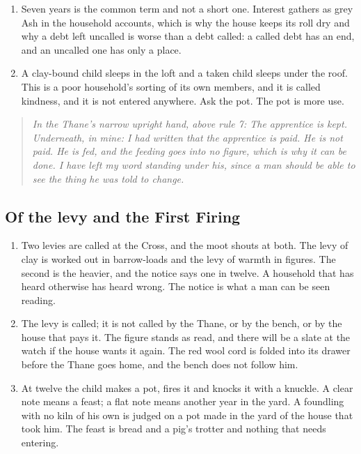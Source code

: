 \documentclass{design/chronicle}
\begin{document}
\begin{enumerate}[leftmargin=1.4em,itemsep=1pt,topsep=3pt,parsep=0pt]

\item Seven years is the common term and not a short one. Interest gathers as grey Ash in the household accounts, which is why the house keeps its roll dry and why a debt left uncalled is worse than a debt called: a called debt has an end, and an uncalled one has only a place.

\item A clay-bound child sleeps in the loft and a taken child sleeps under the roof. This is a poor household’s sorting of its own members, and it is called kindness, and it is not entered anywhere. Ask the pot. The pot is more use.

\end{enumerate}

\begin{quote}\itshape \emph{In the Thane’s narrow upright hand, above rule 7:} The apprentice is kept. \emph{Underneath, in mine:} I had written that the apprentice is paid. He is not paid. He is fed, and the feeding goes into no figure, which is why it can be done. I have left my word standing under his, since a man should be able to see the thing he was told to change.\end{quote}

\subsection*{Of the levy and the First Firing}

\begin{enumerate}[leftmargin=1.4em,itemsep=1pt,topsep=3pt,parsep=0pt]

\item Two levies are called at the Cross, and the moot shouts at both. The levy of clay is worked out in barrow-loads and the levy of warmth in figures. The second is the heavier, and the notice says one in twelve. A household that has heard otherwise has heard wrong. The notice is what a man can be seen reading.

\item The levy is called; it is not called by the Thane, or by the bench, or by the house that pays it. The figure stands as read, and there will be a slate at the watch if the house wants it again. The red wool cord is folded into its drawer before the Thane goes home, and the bench does not follow him.

\item At twelve the child makes a pot, fires it and knocks it with a knuckle. A clear note means a feast; a flat note means another year in the yard. A foundling with no kiln of his own is judged on a pot made in the yard of the house that took him. The feast is bread and a pig’s trotter and nothing that needs entering.

\end{enumerate}
\end{document}
